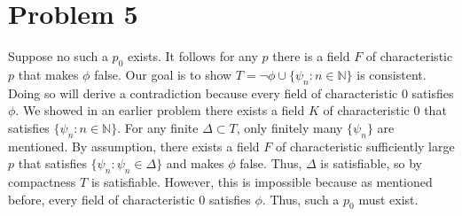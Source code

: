 \documentclass[10pt]{article}
\begin{document}
\section*{Problem 5}
Suppose no such a $p_0$ exists. 
It follows for any $p$ there is a field $F$ of characteristic $p$ that makes $\phi$ false.
Our goal is to show $T=\lnot\phi\cup\{\psi_n:n\in\mathbb{N}\}$ is consistent.
Doing so will derive a contradiction because every field of characteristic $0$ satisfies $\phi$.
We showed in an earlier problem there exists a field $K$ of characteristic $0$ that satisfies $\{\psi_n:n\in\mathbb{N}\}$.
For any finite $\Delta\subset T$, only finitely many $\{\psi_n\}$ are mentioned. 
By assumption, there exists a field $F$ of characteristic sufficiently large $p$ that satisfies $\{\psi_{n}: \psi_{n}\in\Delta\}$ and makes $\phi$ false.
Thus, $\Delta$ is satisfiable, so by compactness $T$ is satisfiable.
However, this is impossible because as mentioned before, every field of characteristic $0$ satisfies $\phi$.
Thus, such a $p_0$ must exist.
\end{document}
